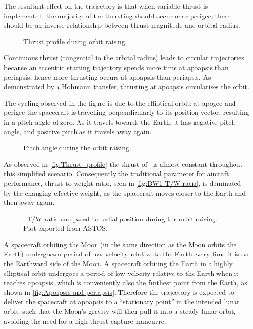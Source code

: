 The resultant effect on the trajectory is that when variable thrust is implemented, the majority of the thrusting should occur near perigee; there should be an inverse relationship between thrust magnitude and orbital radius. 

\begin{figure}
\begin{center}
\end{center}
\caption{Thrust profile during orbit raising.}
\label{fig:Thrust_profile}
\end{figure}

Continuous thrust (tangential to the orbital radius) leads to circular trajectories because an eccentric starting trajectory spends more time at apoapsis than periapsis; hence more thrusting occurs at apoapsis than periapsis. As demonstrated by a Hohmann transfer, thrusting at apoapsis circularises the orbit.

The cycling observed in the figure is due to the elliptical orbit; at apogee and perigee the spacecraft is travelling perpendicularly to its position vector, resulting in a pitch angle of zero. As it travels towards the Earth, it has negative pitch angle, and positive pitch as it travels away again.
 
\begin{figure}
\begin{center}
\end{center}
\caption{Pitch angle during the orbit raising.}
\label{fig:BW1-Pitch}
\end{figure}

As observed in \autoref{fig:Thrust_profile} the thrust of \BW\ is almost constant throughout this simplified scenario. Consequently the traditional parameter for aircraft performance, thrust-to-weight ratio, seen in \autoref{fig:BW1-T/W-ratio}, is dominated by the changing effective weight, as the spacecraft moves closer to the Earth and then away again.

\begin{figure}
\begin{center}
\end{center}
\caption{\BW\ T/W ratio compared to radial position during the orbit raising. Plot exported from ASTOS.}
\label{fig:BW1-T/W-ratio}
\end{figure}

A spacecraft orbiting the Moon (in the same direction as the Moon orbits the Earth) undergoes a period of low velocity relative to the Earth every time it is on the Earthward side of the Moon. A spacecraft orbiting the Earth in a highly elliptical orbit undergoes a period of low velocity relative to the Earth when it reaches apoapsis, which is conveniently also the furthest point from the Earth, as shown in \autoref{fig:Apoapsis-and-periapsis}. Therefore the trajectory is expected to deliver the spacecraft at apoapsis to a \enquote{stationary point} in the intended lunar orbit, such that the Moon's gravity will then pull it into a steady lunar orbit, avoiding the need for a high-thrust capture maneuvre.

